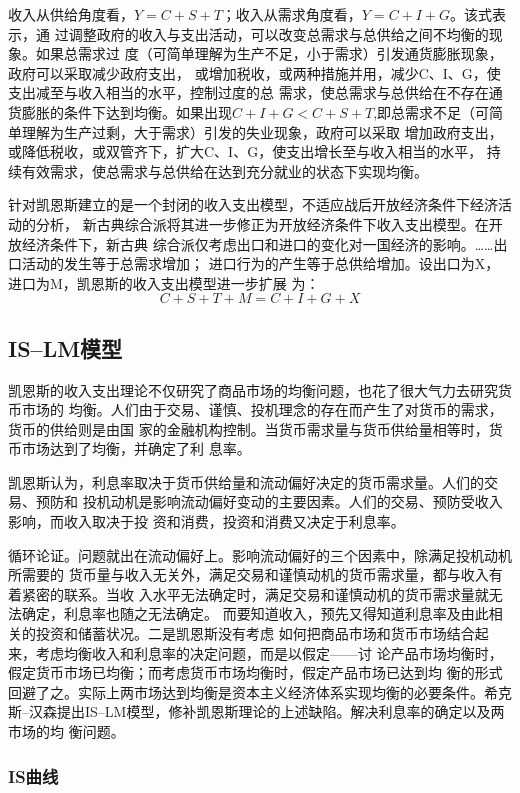 收入从供给角度看，$Y = C + S +T$；收入从需求角度看，$Y = C + I +G$。该式表示，通
过调整政府的收入与支出活动，可以改变总需求与总供给之间不均衡的现象。如果总需求过
度（可简单理解为生产不足，小于需求）引发通货膨胀现象，政府可以采取减少政府支出，
或增加税收，或两种措施并用，减少C、I、G，使支出减至与收入相当的水平，控制过度的总
需求，使总需求与总供给在不存在通货膨胀的条件下达到均衡。如果出现$C + I + G < C +
S + T$,即总需求不足（可简单理解为生产过剩，大于需求）引发的失业现象，政府可以采取
增加政府支出，或降低税收，或双管齐下，扩大C、I、G，使支出增长至与收入相当的水平，
持续有效需求，使总需求与总供给在达到充分就业的状态下实现均衡。

针对凯恩斯建立的是一个封闭的收入支出模型，不适应战后开放经济条件下经济活动的分析，
新古典综合派将其进一步修正为开放经济条件下收入支出模型。在开放经济条件下，新古典
综合派仅考虑出口和进口的变化对一国经济的影响。……出口活动的发生等于总需求增加；
进口行为的产生等于总供给增加。设出口为X，进口为M，凯恩斯的收入支出模型进一步扩展
为：
\[C + S + T + M = C + I + G + X\]

\subsection{IS--LM模型}

凯恩斯的收入支出理论不仅研究了商品市场的均衡问题，也花了很大气力去研究货币市场的
均衡。人们由于交易、谨慎、投机理念的存在而产生了对货币的需求，货币的供给则是由国
家的金融机构控制。当货币需求量与货币供给量相等时，货币市场达到了均衡，并确定了利
息率。

凯恩斯认为，利息率取决于货币供给量和流动偏好决定的货币需求量。人们的交易、预防和
投机动机是影响流动偏好变动的主要因素。人们的交易、预防受收入影响，而收入取决于投
资和消费，投资和消费又决定于利息率。

循环论证。问题就出在流动偏好上。影响流动偏好的三个因素中，除满足投机动机所需要的
货币量与收入无关外，满足交易和谨慎动机的货币需求量，都与收入有着紧密的联系。当收
入水平无法确定时，满足交易和谨慎动机的货币需求量就无法确定，利息率也随之无法确定。
而要知道收入，预先又得知道利息率及由此相关的投资和储蓄状况。二是凯恩斯没有考虑
如何把商品市场和货币市场结合起来，考虑均衡收入和利息率的决定问题，而是以假定——讨
论产品市场均衡时，假定货币市场已均衡；而考虑货币市场均衡时，假定产品市场已达到均
衡的形式回避了之。实际上两市场达到均衡是资本主义经济体系实现均衡的必要条件。希克
斯--汉森提出IS--LM模型，修补凯恩斯理论的上述缺陷。解决利息率的确定以及两市场的均
衡问题。

\subsubsection{IS曲线}

